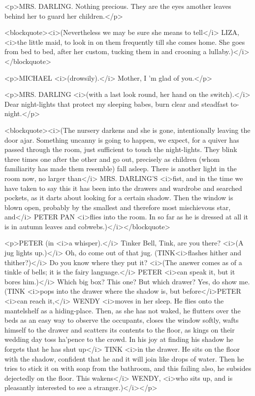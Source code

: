 <p>MRS. DARLING. Nothing precious. They are the eyes amother leaves behind her to guard her children.</p>

<blockquote><i>(Nevertheless we may be sure she means to tell</i> LIZA, <i>the little maid, to look in on them frequently till she comes home. She goes from bed to bed, after her custom, tucking them in and crooning a lullaby.)</i></blockquote>

<p>MICHAEL <i>(drowsily).</i> Mother, I 'm glad of you.</p>

<p>MRS. DARLING <i>(with a last look round, her hand on the switch).</i> Dear night-lights that protect my sleeping babes, burn clear and steadfast to-night.</p>

<blockquote><i>(The nursery darkens and she is gone, intentionally leaving the door ajar. Something uncanny is going to happen, we expect, for a quiver has passed through the room, just sufficient to touch the night-lights. They blink three times one after the other and go out, precisely as children (whom familiarity has made them resemble) fall asleep. There is another light in the room now, no larger than</i> MRS. DARLING'S <i>fist, and in the time we have taken to say this it has been into the drawers and wardrobe and searched pockets, as it darts about looking for a certain shadow. Then the window is blown open, probably by the smallest and therefore most mischievous star, and</i> PETER PAN <i>flies into the room. In so far as he is dressed at all it is in autumn leaves and cobwebs.)</i></blockquote>

<p>PETER (in <i>a whisper).</i> Tinker Bell, Tink, are you there? <i>(A jug lights up.)</i> Oh, do come out of that jug. (TINK<i>flashes hither and thither?)</i> Do you know where they put it? <i>(The answer comes as of a tinkle of bells; it is the fairy language.</i> PETER <i>can speak it, but it bores him.)</i> Which big box? This one? But which drawer? Yes, do show me. (TINK <i>pops into the drawer where the shadow is, but before</i>PETER <i>can reach it,</i> WENDY <i>moves in her sleep. He flies onto the mantelshelf as a hiding-place. Then, as she has not waked, he flutters over the beds as an easy way to observe the occupants, closes the window softly, wafts himself to the drawer and scatters its contents to the floor, as kings on their wedding day toss ha'pence to the crowd. In his joy at finding his shadow he forgets that he has shut up</i> TINK <i>in the drawer. He sits on the floor with the shadow, confident that he and it will join like drops of water. Then he tries to stick it on with soap from the bathroom, and this failing also, he subsides dejectedly on the floor. This wakens</i> WENDY, <i>who sits up, and is pleasantly interested to see a stranger.)</i></p>

